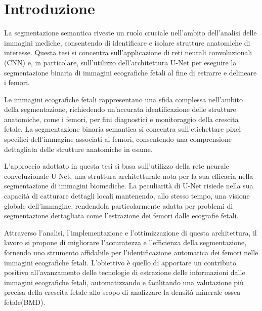 \chapter{Introduzione} \label{chap:Introduzione}

La segmentazione semantica riveste un ruolo cruciale nell'ambito dell'analisi
delle immagini mediche, consentendo di identificare e isolare strutture
anatomiche di interesse. Questa tesi si concentra sull'applicazione di reti
neurali convoluzionali (CNN) e, in particolare, sull'utilizzo dell'architettura
U-Net per eseguire la segmentazione binaria di immagini ecografiche fetali al
fine di estrarre e delineare i femori.

Le immagini ecografiche fetali rappresentano una sfida complessa nell'ambito
della segmentazione, richiedendo un'accurata identificazione delle strutture
anatomiche, come i femori, per fini diagnostici e monitoraggio della crescita
fetale. La segmentazione binaria semantica si concentra sull'etichettare pixel
specifici dell'immagine associati ai femori, consentendo una comprensione
dettagliata delle strutture anatomiche in esame.

L'approccio adottato in questa tesi si basa sull'utilizzo della rete neurale
convoluzionale U-Net, una struttura architetturale nota per la sua efficacia
nella segmentazione di immagini biomediche. La peculiarità di U-Net risiede
nella sua capacità di catturare dettagli locali mantenendo, allo stesso tempo,
una visione globale dell'immagine, rendendola particolarmente adatta per
problemi di segmentazione dettagliata come l'estrazione dei femori dalle
ecografie fetali.

Attraverso l'analisi, l'implementazione e l'ottimizzazione di questa
architettura, il lavoro si propone di migliorare l'accuratezza e l'efficienza
della segmentazione, fornendo uno strumento affidabile per l'identificazione
automatica dei femori nelle immagini ecografiche fetali. L'obiettivo è quello di
apportare un contributo positivo all'avanzamento delle tecnologie di estrazione
delle informazioni dalle immagini ecografiche fetali, automatizzando e
facilitando una valutazione più precisa della crescita fetale allo scopo di
analizzare la densità minerale ossea fetale(BMD).
